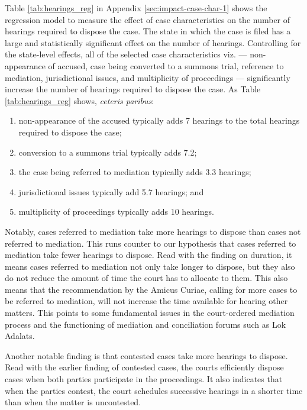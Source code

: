 Table \ref{tab:hearings_reg} in Appendix \ref{sec:impact-case-char-1} shows the regression model to measure the effect of case characteristics on the number of hearings required to dispose the case. The state in which the case is filed has a large and statistically significant effect on the number of hearings. Controlling for the state-level effects, all of the selected case characteristics viz. --- non-appearance of accused, case being converted to a summons trial, reference to mediation, jurisdictional issues, and multiplicity of proceedings --- significantly increase the number of hearings required to dispose the case. As Table \ref{tab:hearings_reg} shows, \emph{ceteris paribus}:

\begin{enumerate}
\item non-appearance of the accused typically adds 7 hearings to the total hearings required to dispose the case;
\item conversion to a summons trial typically adds 7.2;
\item the case being referred to mediation typically adds 3.3 hearings;
\item jurisdictional issues typically add 5.7 hearings; and
\item multiplicity of proceedings typically adds 10 hearings.
\end{enumerate}

Notably, cases referred to mediation take more hearings to dispose than cases not referred to mediation. This runs counter to our hypothesis that cases referred to mediation take fewer hearings to dispose. Read with the finding on duration, it means cases referred to mediation not only take longer to dispose, but they also do not reduce the amount of time the court has to allocate to them. This also means that the recommendation by the Amicus Curiae, calling for more cases to be referred to mediation, will not increase the time available for hearing other matters. This points to some fundamental issues in the court-ordered mediation process and the functioning of mediation and conciliation forums such as Lok Adalats.

Another notable finding is that contested cases take more hearings to dispose. Read with the earlier finding of contested cases, the courts efficiently dispose cases when both parties participate in the proceedings. It also indicates that when the parties contest, the court schedules successive hearings in a shorter time than when the matter is uncontested.

